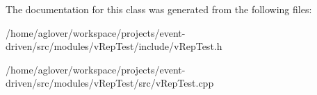 The documentation for this class was generated from the following files\+:\begin{DoxyCompactItemize}
\item 
/home/aglover/workspace/projects/event-\/driven/src/modules/v\+Rep\+Test/include/v\+Rep\+Test.\+h\item 
/home/aglover/workspace/projects/event-\/driven/src/modules/v\+Rep\+Test/src/v\+Rep\+Test.\+cpp\end{DoxyCompactItemize}
